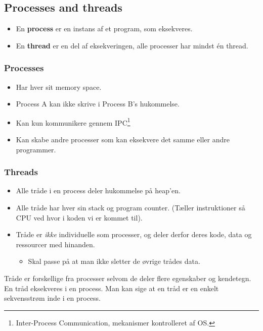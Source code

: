 \newpage

\subsection{Processes and threads}
\begin{itemize}
	\item En \textbf{process} er en instans af et program, som eksekveres.
	\item En \textbf{thread} er en del af eksekveringen, alle processer har mindst én thread.
\end{itemize}

\subsubsection{Processes}
\begin{itemize}
	\item Har hver sit memory space.
	\item Process A kan ikke skrive i Process B's hukommelse.
	\item Kan kun kommunikere gennem IPC\footnote{Inter-Process Communication, mekanismer kontrolleret af OS.}
	\item Kan skabe andre processer som kan eksekvere det samme eller andre programmer.
\end{itemize}

\subsubsection{Threads}
\begin{itemize}
	\item Alle tråde i en process deler hukommelse på heap'en.
	\item Alle tråde har hver sin stack og program counter. (Tæller instruktioner så CPU ved hvor i koden vi er kommet til).
	\item Tråde er \textit{ikke} individuelle som processer, og deler derfor deres kode, data og ressourcer med hinanden. 
	\begin{itemize}
		\item Skal passe på at man ikke sletter de øvrige trådes data.
	\end{itemize}
\end{itemize}

Tråde er forskellige fra processer selvom de deler flere egenskaber og kendetegn. En tråd eksekveres i en process. Man kan sige at en tråd er en enkelt sekvensstrøm inde i en process.

